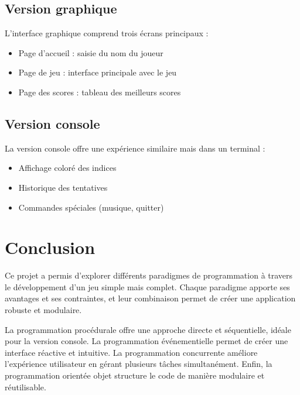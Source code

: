 \documentclass{article}
\begin{document}
\subsection{Version graphique}
L'interface graphique comprend trois écrans principaux :
\begin{itemize}
    \item Page d'accueil : saisie du nom du joueur
    \item Page de jeu : interface principale avec le jeu
    \item Page des scores : tableau des meilleurs scores
\end{itemize}

\subsection{Version console}
La version console offre une expérience similaire mais dans un terminal :
\begin{itemize}
    \item Affichage coloré des indices
    \item Historique des tentatives
    \item Commandes spéciales (musique, quitter)
\end{itemize}



\section{Conclusion}

Ce projet a permis d'explorer différents paradigmes de programmation à travers le développement d'un jeu simple mais complet. Chaque paradigme apporte ses avantages et ses contraintes, et leur combinaison permet de créer une application robuste et modulaire.

La programmation procédurale offre une approche directe et séquentielle, idéale pour la version console. La programmation événementielle permet de créer une interface réactive et intuitive. La programmation concurrente améliore l'expérience utilisateur en gérant plusieurs tâches simultanément. Enfin, la programmation orientée objet structure le code de manière modulaire et réutilisable.
\end{document}
